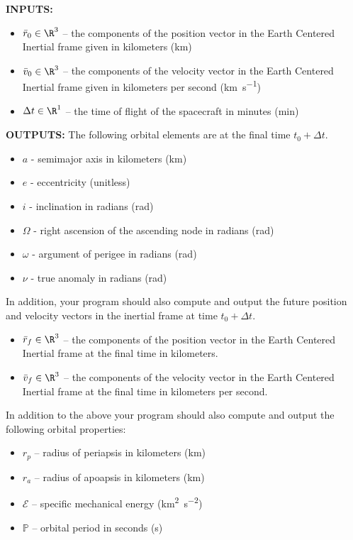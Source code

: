 \documentclass[11pt, reqno]{article}    %
\begin{document}
\noindent \textbf{INPUTS:}
\begin{itemize}
    \item \( \bar r_0 \in \R^{3} \) -- the components of the position vector in the Earth Centered Inertial frame given in kilometers (\si{\kilo\meter})
    \item \( \bar v_0 \in \R^{3} \) -- the components of the velocity vector in the Earth Centered Inertial frame given in kilometers per second (\si{\kilo\meter\per\second})
    \item \( \Delta t \in \R^{1} \) -- the time of flight of the spacecraft in minutes (\si{\minute})
\end{itemize}

\noindent \textbf{OUTPUTS:}
The following orbital elements are at the final time \( t_0 + \Delta t \).
\begin{itemize}
    \item \( a \)  - semimajor axis in kilometers (\si{\kilo\meter})
    \item \( e \) - eccentricity (unitless)
    \item \( i \) - inclination in radians (\si{\radian})
    \item \( \Omega \) - right ascension of the ascending node in radians (\si{\radian})
    \item \( \omega \) - argument of perigee in radians (\si{\radian})
    \item \( \nu \) - true anomaly in radians (\si{\radian})
\end{itemize}
In addition, your program should also compute and output the future position and velocity vectors in the inertial frame at time \( t_0 + \Delta t \).
\begin{itemize}
    \item \( \bar r_f \in \R^3 \) -- the components of the position vector in the Earth Centered Inertial frame at the final time in kilometers.
    \item \( \bar v_f \in \R^3 \) -- the components of the velocity vector in the Earth Centered Inertial frame at the final time in kilometers per second.
\end{itemize}

In addition to the above your program should also compute and output the following orbital properties:

\begin{itemize}
    \item \( r_p \) -- radius of periapsis in kilometers (\si{\kilo\meter})
    \item \( r_a \) -- radius of apoapsis in kilometers (\si{\kilo\meter})
    \item \( \mathcal{E} \) -- specific mechanical energy (\si{\kilo\meter\squared\per\second\squared})
    \item \( \mathbb{P} \) -- orbital period in seconds (\si{\second})
\end{itemize}
\end{document}
